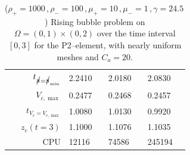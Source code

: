 \begin{table}
\begin{tabular}{rlll}
$t_{\strikes = \strikes_{\min}}$ & 2.2410 & 2.0180 & 2.0830 \\
$V_{c,\max}$                     & 0.2477 & 0.2468 & 0.2457 \\
$t_{V_c = V_{c,\max}}$           & 1.0080 & 1.0130 & 0.9920 \\
$z_c(t=3)$                       & 1.1000 & 1.1076 & 1.1035 \\
CPU                              &  12116 &  74586 & 245194 \\
\hline
\end{tabular}
\hspace*{-3.25cm}
\caption[Navier--Stokes 2d rising bubble benchmark values P2--\pdg]
{($\rho_+ = 1000\,,\rho_- = 100\,,\mu_+ = 10\,,\mu_- =1\,,\gamma = 24.5\,$)
Rising bubble problem on ${\Omega = (0,1) \times (0,2)}$ over the time interval
$[0,3]$ for the P2--\pdg element, with nearly uniform meshes and
$C_a=20$\textdegree.}
\label{tab:risingbubble2Dp2p1dg}
\end{table}


